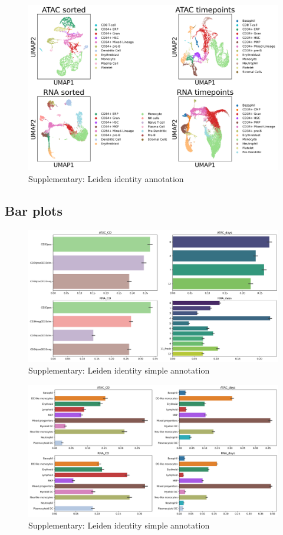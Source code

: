 \documentclass[a4paper]{article}
\begin{document}
\begin{figure}[!htb]
  \centering
  \includegraphics[width=\textwidth]{../figures/hematopoiesis/leiden_identity.png}
  \caption{Supplementary: Leiden identity annotation}
\end{figure}

\FloatBarrier
\subsection{Bar plots}

\begin{figure}[!htb]
  \centering
  \includegraphics[width=\textwidth]{../figures/hematopoiesis/label_proportions.png}
  \caption{Supplementary: Leiden identity simple annotation}
\end{figure}

\begin{figure}[!htb]
  \centering
  \includegraphics[width=\textwidth]{../figures/hematopoiesis/leiden_identity_simple2_proportions.png}
  \caption{Supplementary: Leiden identity simple annotation}
\end{figure}
\end{document}
